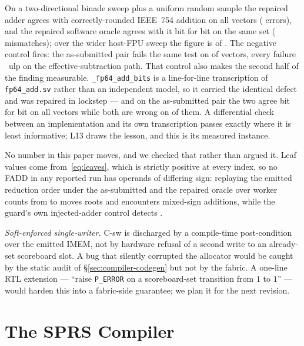 \documentclass[journal,10pt]{IEEEtran}
\theoremstyle{plain}
\theoremstyle{definition}
\theoremstyle{remark}
\newcommand{\sv}[1]{\texttt{#1}}
\begin{document}
On a two-directional binade sweep plus a uniform random sample the repaired
adder agrees with correctly-rounded IEEE~754 addition on all
\FpAcceptVectors{} vectors (\FpAcceptErrors{} errors), and the repaired
software oracle agrees with it bit for bit on the same set
(\FpAcceptMismatch{} mismatches); over the wider host-FPU sweep the figure is
\FpSweepErrors{} of \FpSweepVectors{}. The negative control fires: the
as-submitted pair fails the same test on \FpCtrlErrors{} of \FpCtrlVectors{}
vectors, every failure \FpCtrlUlp{}~ulp on the effective-subtraction path.
That control also makes the second half of the finding measurable.
\sv{\_fp64\_add\_bits} is a line-for-line transcription of \sv{fp64\_add.sv}
rather than an independent model, so it carried the identical defect and was
repaired in lockstep --- and on the as-submitted pair the two agree bit for
bit on all \FpCtrlVectors{} vectors while both are wrong on \FpCtrlErrors{} of
them. A differential check between an implementation and its own transcription
passes exactly where it is least informative; L13 draws the lesson, and this
is its measured instance.

No number in this paper moves, and we checked that rather than argued it. Leaf
values come from~\eqref{eq:leaves}, which is strictly positive at every index,
so no FADD in any reported run has operands of differing sign: replaying the
emitted reduction order under the as-submitted and the repaired oracle over
\FpScopeGvals{} worker counts from \FpScopeGLo{} to \FpScopeGHi{} moves
\FpScopeMoved{} roots and encounters \FpScopeMixed{} mixed-sign additions,
while the guard's own injected-adder control detects \FpScopeMutant{}.

\emph{Soft-enforced single-writer.} \textsf{C-sw} is discharged by a
compile-time post-condition over the emitted IMEM, not by hardware
refusal of a second write to an already-set scoreboard slot. A bug that
silently corrupted the allocator would be caught by the static audit of
\S\ref{sec:compiler-codegen} but not by the fabric. A one-line RTL extension --- ``raise
\texttt{P\_ERROR} on a scoreboard-set transition from $1$ to $1$'' ---
would harden this into a fabric-side guarantee; we plan it for the next
revision.


\section{The SPRS Compiler}\label{sec:compiler}
\end{document}
